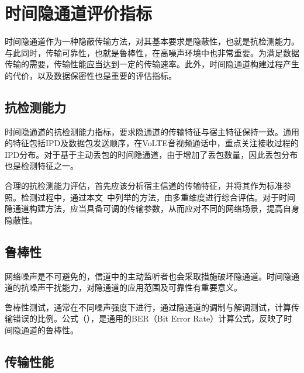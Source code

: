 \section{时间隐通道评价指标}
\label{chap:backinfo:metric}

时间隐通道作为一种隐蔽传输方法，对其基本要求是隐蔽性，也就是抗检测能力。与此同时，传输可靠性，也就是鲁棒性，在高噪声环境中也非常重要。为满足数据传输的需要，传输性能应当达到一定的传输速率。此外，时间隐通道构建过程产生的代价，以及数据保密性也是重要的评估指标。

\subsection{抗检测能力}
\label{chap:backinfo:metric:undetectability}

时间隐通道的抗检测能力指标，要求隐通道的传输特征与宿主特征保持一致。通用的特征包括IPD及数据包发送顺序，在VoLTE音视频通话中，重点关注接收过程的IPD分布。对于基于主动丢包的时间隐通道，由于增加了丢包数量，因此丢包分布也是检测特征之一。

合理的抗检测能力评估，首先应该分析宿主信道的传输特征，并将其作为标准参照。检测过程中，通过本文\ 中列举的方法，由多重维度进行综合评估。对于时间隐通道构建方法，应当具备可调的传输参数，从而应对不同的网络场景，提高自身隐蔽性。

\subsection{鲁棒性}
\label{chap:backinfo:metric:robustness}

网络噪声是不可避免的，信道中的主动监听者也会采取措施破坏隐通道。时间隐通道的抗噪声干扰能力，对隐通道的应用范围及可靠性有重要意义。

鲁棒性测试，通常在不同噪声强度下进行，通过隐通道的调制与解调测试，计算传输错误的比例。公式（），是通用的BER（Bit Error Rate）计算公式，反映了时间隐通道的鲁棒性。

\subsection{传输性能}
\label{chap:backinfo:metric:throughput}

